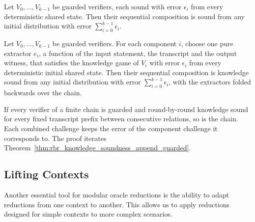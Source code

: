 \begin{theorem}
    \label{thm:soundness_compose}
    Let $V_0, \ldots, V_{k-1}$ be guarded verifiers, each sound with error $\epsilon_i$ from every
    deterministic shared state. Then their sequential composition is sound from any initial
    distribution with error $\sum_{i=0}^{k-1} \epsilon_i$.
    \leanok
\end{theorem}

\begin{theorem}
    \label{thm:knowledge_soundness_compose}
    Let $V_0, \ldots, V_{k-1}$ be guarded verifiers. For each component $i$, choose one pure
    extractor $e_i$, a function of the input statement, the transcript and the output witness, that
    satisfies the knowledge game of $V_i$ with error $\epsilon_i$ from every deterministic initial
    shared state. Then their
    sequential composition is knowledge sound from any initial distribution with error
    $\sum_{i=0}^{k-1} \epsilon_i$, with the extractors folded backwards over the chain.
    \leanok
\end{theorem}

\begin{theorem}
    \label{thm:rbr_knowledge_soundness_compose_guarded}
    If every verifier of a finite chain is guarded and round-by-round knowledge sound for every
    fixed transcript prefix between consecutive relations, so is the chain. Each combined
    challenge keeps the error of the component challenge it corresponds to. The proof iterates
    Theorem~\ref{thm:rbr_knowledge_soundness_append_guarded}.
    \leanok
\end{theorem}

\subsection{Lifting Contexts}\label{sec:lifting_contexts}

Another essential tool for modular oracle reductions is the ability to adapt reductions from one context to another. This allows us to apply reductions designed for simple contexts to more complex scenarios.


